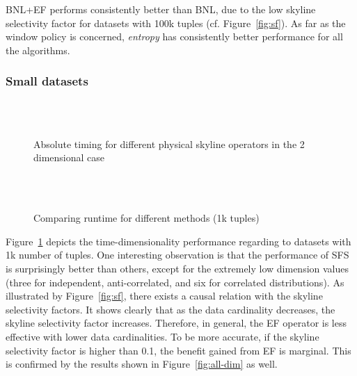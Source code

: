 BNL+EF performs consistently better than BNL, due to the low skyline
selectivity factor for datasets with 100k tuples
(cf. Figure~\ref{fig:sf}).  As far as the window policy is concerned,
\emph{entropy} has consistently better performance for all the
algorithms.

\subsubsection{Small datasets}
\label{sec:small-datasets}

\begin{figure}[htbp]
\centering%
\begin{minipage}{\onecolumnwidth}%
\\
\\
%
\caption{Absolute timing for different physical skyline operators 
in the 2 dimensional case}%
\end{minipage}%
\hspace{\columnsep}%
\begin{minipage}{\onecolumnwidth}%
\\
\\
%
\caption{Comparing runtime for different methods (1k tuples)}
\label{fig:all-dim-onek}
\end{minipage}%
\end{figure}

Figure~\ref{fig:all-dim-onek}
depicts the time-dimensionality performance regarding to datasets with 1k number of tuples.
One interesting observation is that the performance of SFS 
is surprisingly better than others, except for the extremely low dimension values
(three for independent, anti-correlated, and six for correlated distributions).
As illustrated by Figure~\ref{fig:sf}, 
there exists a causal relation with the skyline selectivity factors.
It shows clearly that as the data cardinality decreases,
the skyline selectivity factor increases. Therefore, in general, the EF operator is less effective 
with lower data cardinalities. To be more accurate, if the skyline selectivity factor
is higher than 0.1, the benefit gained from EF is marginal. 
This is confirmed by the results shown in Figure~\ref{fig:all-dim} as well.

